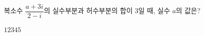 복소수 $\dfrac{a+3i}{2-i}$의 실수부분과 허수부분의 합이 $3$일 때, 실수 $a$의 값은? 
\begin{choices32}{$1$}{$2$}{$3$}{$4$}{$5$}\end{choices32}
